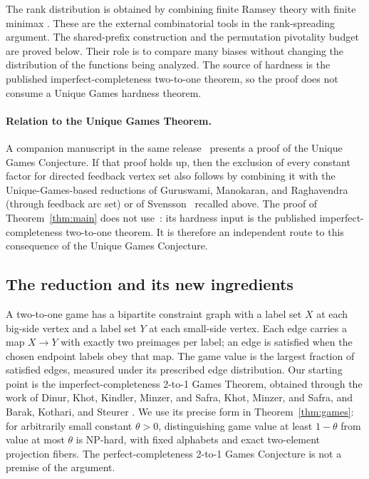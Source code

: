The rank distribution is obtained by combining finite Ramsey theory
\cite{Ramsey1930} with finite minimax \cite{vonNeumann1928}.
These are the external combinatorial tools in the rank-spreading
argument. The shared-prefix construction and the permutation
pivotality budget are proved below. Their role is to compare many
biases without changing the distribution of the functions being
analyzed. The source of hardness is the published imperfect-completeness
two-to-one theorem, so the proof does not consume a Unique Games
hardness theorem.

\paragraph{Relation to the Unique Games Theorem.}
A companion manuscript in the same release~\cite{OpenAIUniqueGames2026}
presents a proof of the Unique Games Conjecture. If that proof holds up,
then the exclusion of every constant factor for directed feedback vertex
set also follows by combining it with the Unique-Games-based reductions
of Guruswami, Manokaran, and Raghavendra~\cite{GMR2008} (through feedback
arc set) or of Svensson~\cite{Svensson2013} recalled above. The proof of Theorem~\ref{thm:main} does not
use~\cite{OpenAIUniqueGames2026}: its hardness input is the published
imperfect-completeness two-to-one theorem. It is therefore an
independent route to this consequence of the Unique Games Conjecture.

\subsection{The reduction and its new ingredients}

A two-to-one game has a bipartite constraint graph with a label set
$X$ at each big-side vertex and a label set $Y$ at each small-side
vertex. Each edge carries a map $X\to Y$ with exactly two preimages
per label; an edge is satisfied when the chosen endpoint labels obey
that map. The game value is the largest fraction of satisfied edges,
measured under its prescribed edge distribution.
Our starting point is the imperfect-completeness 2-to-1 Games Theorem,
obtained through the work of Dinur, Khot, Kindler, Minzer, and Safra,
Khot, Minzer, and Safra, and Barak, Kothari, and Steurer
\cite{DKKMS2025,KMS2018,BKS2019}. We use its precise form in
Theorem~\ref{thm:games}: for arbitrarily small constant $\theta>0$,
distinguishing game value at least $1-\theta$ from value at most
$\theta$ is NP-hard, with fixed alphabets and exact two-element
projection fibers. The perfect-completeness 2-to-1 Games Conjecture
is not a premise of the argument.

